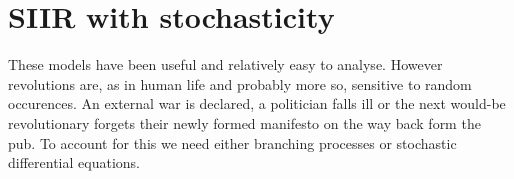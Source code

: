 \section{SIIR with stochasticity}
These models have been useful and relatively easy to analyse. However revolutions are, as in human life and probably more so, sensitive to random occurences. An external war is declared, a politician falls ill or the next would-be revolutionary forgets their newly formed manifesto on the way back form the pub. To account for this we need either branching processes or stochastic differential equations.